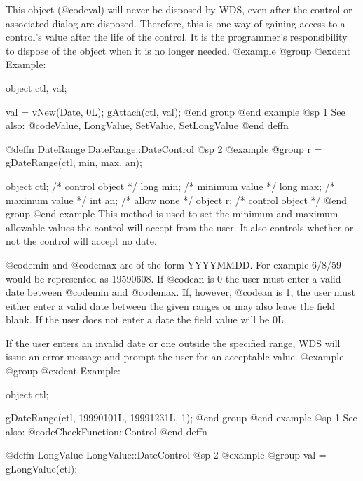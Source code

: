 {This object (@code{val}) will never be disposed by WDS, even after
the control or associated dialog are disposed.  Therefore, this
is one way of gaining access to a control's value after the life
of the control.  It is the programmer's responsibility to dispose of
the object when it is no longer needed.
@example
@group
@exdent Example:

object  ctl, val;

val = vNew(Date, 0L);
gAttach(ctl, val);
@end group
@end example
@sp 1
See also:  @code{Value, LongValue, SetValue, SetLongValue}
@end deffn
















@deffn {DateRange} DateRange::DateControl
@sp 2
@example
@group
r = gDateRange(ctl, min, max, an);

object  ctl;   /*  control object  */
long    min;   /*  minimum value   */
long    max;   /*  maximum value   */
int     an;    /*  allow none      */
object  r;     /*  control object  */
@end group
@end example
This method is used to set the minimum and maximum allowable values
the control will accept from the user.  It also controls whether
or not the control will accept no date.

@code{min} and @code{max} are of the form YYYYMMDD.  For example
6/8/59 would be represented as 19590608.  If @code{an} is 0
the user must enter a valid date between @code{min} and @code{max}.
If, however, @code{an} is 1, the user must either enter a valid
date between the given ranges or may also leave the field blank.
If the user does not enter a date the field value will be 0L.

If the user enters an invalid date or one outside the specified range,
WDS will issue an error message and prompt the user for an acceptable
value.
@example
@group
@exdent Example:

object  ctl;

gDateRange(ctl, 19990101L, 19991231L, 1);
@end group
@end example
@sp 1
See also:  @code{CheckFunction::Control}
@end deffn








@deffn {LongValue} LongValue::DateControl
@sp 2
@example
@group
val = gLongValue(ctl);

}
